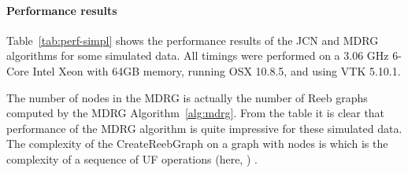 \documentclass[twocolumn]{article}
\begin{document}
\begin{table}[h!]
 \begin{centering}
 \caption{Performance results for Simplification}
\label{tab:perf-simpl}
\end{centering}
\end{table}
\paragraph{Performance results} Table~\ref{tab:perf-simpl} shows the performance
results of the JCN and MDRG algorithms for some simulated
data. All timings were performed on a 3.06 GHz 6-Core Intel Xeon with 64GB memory, running
OSX 10.8.5, and using VTK 5.10.1. 

The number of nodes in the MDRG is actually the number of Reeb graphs
computed by the MDRG Algorithm~\ref{alg:mdrg}. From the table it is clear that
performance of the MDRG algorithm is quite impressive for these
simulated data. The complexity of the CreateReebGraph on a graph with  nodes is  
which is the complexity of a sequence of  UF operations (here,
) \cite{1975-tarjan}. 
 
\end{document}

